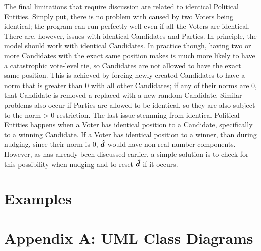 \documentclass[12pt]{article}
\begin{document}
\qquad The final limitations that require discussion are related to identical Political Entities. Simply put, there is no problem with caused by two Voters being identical; the program can run perfectly well even if all the Voters are identical. There are, however, issues with identical Candidates and Parties. In principle, the model should work with identical Candidates. In practice though, having two or more Candidates with the exact same position makes is much more likely to have a catastrophic vote-level tie, so Candidates are not allowed to have the exact same position. This is achieved by forcing newly created Candidates to have a norm that is greater than 0 with all other Candidates; if any of their norms are 0, that Candidate is removed a replaced with a new random Candidate. Similar problems also occur if Parties are allowed to be identical, so they are also subject to the norm > 0 restriction. The last issue stemming from identical Political Entities happens when a Voter has identical position to a Candidate, specifically to a winning Candidate. If a Voter has identical position to a winner, than during nudging, since their norm is 0, $\bm{\hat{d}}$ would have non-real number components. However, as has already been discussed earlier, a simple solution is to check for this possibility when nudging and to reset $\bm{\hat{d}}$ if it occurs. \\

\section{Examples} \label{Examples}







\newpage
\section{Appendix A: UML Class Diagrams} \label{AppA}
\end{document}
